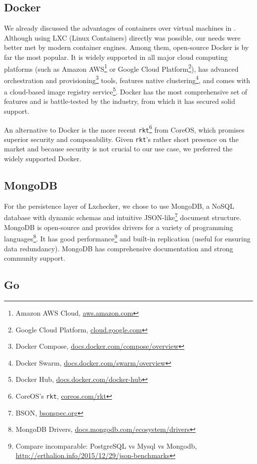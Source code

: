 \subsection{Docker}
\label{sec:tech-docker}

We already discussed the advantages of containers over virtual machines in . Although using LXC (Linux Containers) directly was possible, our needs were better met by modern container engines. Among them, open-source Docker is by far the most popular. It is widely supported in all major cloud computing platforms (such as Amazon AWS\footnote{Amazon AWS Cloud, \url{aws.amazon.com}} or Google Cloud Platform\footnote{Google Cloud Platform, \url{cloud.google.com}}), has advanced orchestration and provisioning\footnote{Docker Compose, \url{docs.docker.com/compose/overview}} tools, features native clustering\footnote{Docker Swarm, \url{docs.docker.com/swarm/overview}}, and comes with a cloud-based image registry service\footnote{Docker Hub, \url{docs.docker.com/docker-hub}}. Docker has the most comprehensive set of features and is battle-tested by the industry, from which it has secured solid support.

An alternative to Docker is the more recent \texttt{rkt}\footnote{CoreOS's \texttt{rkt}, \url{coreos.com/rkt}} from CoreOS, which promises superior security and composability. Given \texttt{rkt}'s rather short presence on the market and because security is not crucial to our use case, we preferred the widely supported Docker.

\subsection{MongoDB}
\label{sec:tech-mongo}

For the persistence layer of Lxchecker, we chose to use MongoDB, a NoSQL database with dynamic schemas and intuitive JSON-like\footnote{BSON, \url{bsonspec.org}} document structure. MongoDB is open-source and provides drivers for a variety of programming languages\footnote{MongoDB Drivers, \url{docs.mongodb.com/ecosystem/drivers}}. It has good performance\footnote{Compare incomparable: PostgreSQL vs Mysql vs Mongodb, \url{http://erthalion.info/2015/12/29/json-benchmarks}} and built-in replication (useful for ensuring data redundancy). MongoDB has comprehensive documentation and strong community support.

\subsection{Go}
\label{sec:tech-go}

